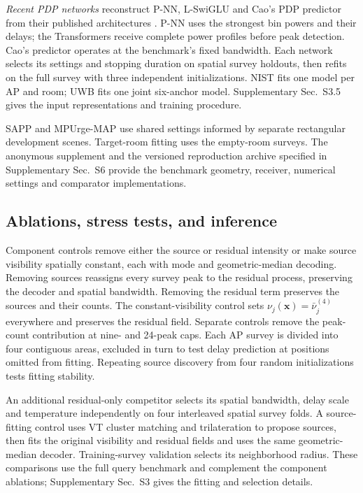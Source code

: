 \documentclass[conference]{IEEEtran}
\begin{document}
\emph{Recent PDP networks} reconstruct P-NN, L-SwiGLU and Cao's PDP predictor from their published architectures \cite{oh2024pnn,masrur2025transforming,cao2026pdp}. P-NN uses the strongest bin powers and their delays; the Transformers receive complete power profiles before peak detection. Cao's predictor operates at the benchmark's fixed bandwidth. Each network selects its settings and stopping duration on spatial survey holdouts, then refits on the full survey with three independent initializations. NIST fits one model per AP and room; UWB fits one joint six-anchor model. Supplementary Sec.~S3.5 gives the input representations and training procedure.

SAPP and MPUrge-MAP use shared settings informed by separate rectangular development scenes. Target-room fitting uses the empty-room surveys. The anonymous supplement and the versioned reproduction archive specified in Supplementary Sec.~S6 provide the benchmark geometry, receiver, numerical settings and comparator implementations.

\subsection{Ablations, stress tests, and inference}
Component controls remove either the source or residual intensity or make source visibility spatially constant, each with mode and geometric-median decoding. Removing sources reassigns every survey peak to the residual process, preserving the decoder and spatial bandwidth. Removing the residual term preserves the sources and their counts. The constant-visibility control sets $\nu_j(\bm x)=\bar\nu_j^{(4)}$ everywhere and preserves the residual field. Separate controls remove the peak-count contribution at nine- and 24-peak caps. Each AP survey is divided into four contiguous areas, excluded in turn to test delay prediction at positions omitted from fitting. Repeating source discovery from four random initializations tests fitting stability.

An additional residual-only competitor selects its spatial bandwidth, delay scale and temperature independently on four interleaved spatial survey folds. A source-fitting control uses VT cluster matching and trilateration to propose sources, then fits the original visibility and residual fields and uses the same geometric-median decoder. Training-survey validation selects its neighborhood radius. These comparisons use the full query benchmark and complement the component ablations; Supplementary Sec.~S3 gives the fitting and selection details.
\end{document}
